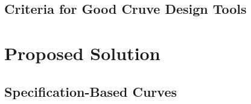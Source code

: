 \documentclass[a4paper]{article}
\begin{document}

		\subsection{Criteria for Good Cruve Design Tools}

%
%


	\section{Proposed Solution}

		\subsection{Specification-Based Curves}
\end{document}
